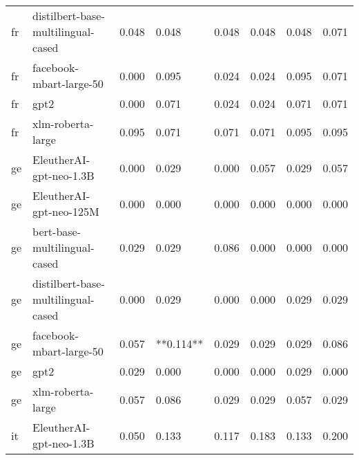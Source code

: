 \begin{tabular}{llllllll}
      fr & distilbert-base-multilingual-cased &     0.048 &                     0.048 &                 0.048 &                  0.048 &                                   0.048 &     0.071 \\
      fr &            facebook-mbart-large-50 &     0.000 &                     0.095 &                 0.024 &                  0.024 &                                   0.095 &     0.071 \\
      fr &                               gpt2 &     0.000 &                     0.071 &                 0.024 &                  0.024 &                                   0.071 &     0.071 \\
      fr &                  xlm-roberta-large &     0.095 &                     0.071 &                 0.071 &                  0.071 &                                   0.095 &     0.095 \\
      ge &            EleutherAI-gpt-neo-1.3B &     0.000 &                     0.029 &                 0.000 &                  0.057 &                                   0.029 &     0.057 \\
      ge &            EleutherAI-gpt-neo-125M &     0.000 &                     0.000 &                 0.000 &                  0.000 &                                   0.000 &     0.000 \\
      ge &       bert-base-multilingual-cased &     0.029 &                     0.029 &                 0.086 &                  0.000 &                                   0.000 &     0.000 \\
      ge & distilbert-base-multilingual-cased &     0.000 &                     0.029 &                 0.000 &                  0.000 &                                   0.029 &     0.029 \\
      ge &            facebook-mbart-large-50 &     0.057 &                 **0.114** &                 0.029 &                  0.029 &                                   0.029 &     0.086 \\
      ge &                               gpt2 &     0.029 &                     0.000 &                 0.000 &                  0.000 &                                   0.029 &     0.000 \\
      ge &                  xlm-roberta-large &     0.057 &                     0.086 &                 0.029 &                  0.029 &                                   0.057 &     0.029 \\
      it &            EleutherAI-gpt-neo-1.3B &     0.050 &                     0.133 &                 0.117 &                  0.183 &                                   0.133 &     0.200 \\

\end{tabular}
